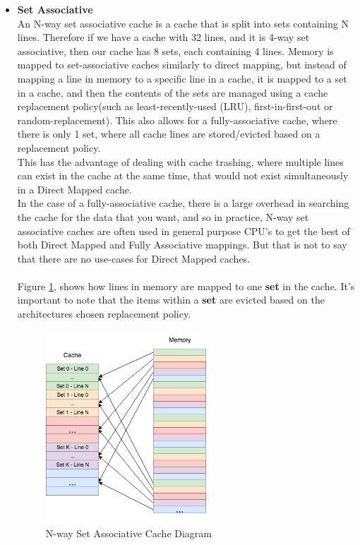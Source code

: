 \documentclass[bsc,frontabs,twoside,singlespacing,parskip,deptreport]{infthesis}     %
\begin{document}
\begin{itemize}
    \item{
        {\bf Set Associative} \\
        An N-way set associative cache is a cache that is split into sets containing N lines. Therefore if we have a cache with 32 lines, and it is 4-way set associative, then our cache has 8 sets, each containing 4 lines. Memory is mapped to set-associative caches similarly to direct mapping, but instead of mapping a line in memory to a specific line in a cache, it is mapped to a set in a cache, and then the contents of the sets are managed using a cache replacement policy(such as least-recently-used (LRU), first-in-first-out or random-replacement). This also allows for a fully-associative cache, where there is only 1 set, where all cache lines are stored/evicted based on a replacement policy. \\
        This has the advantage of dealing with cache trashing, where multiple lines can exist in the cache at the same time, that would not exist simultaneously in a Direct Mapped cache. \\
        In the case of a fully-associative cache, there is a large overhead in searching the cache for the data that you want, and so in practice, N-way set associative caches are often used in general purpose CPU's to get the best of both Direct Mapped and Fully Associative mappings. But that is not to say that there are no use-cases for Direct Mapped caches. \\
        \\
        Figure \ref{fig:set-assoc}, shows how lines in memory are mapped to one \textbf{set} in the cache. It's important to note that the items within a \textbf{set} are evicted based on the architectures chosen replacement policy. 
    }
    \begin{figure}[h]
        \includegraphics[width=6cm]{set_assoc.png}
        \centering
        \caption{N-way Set Associative Cache Diagram}
        \label{fig:set-assoc}
    \end{figure}
\end{itemize}
\end{document}
